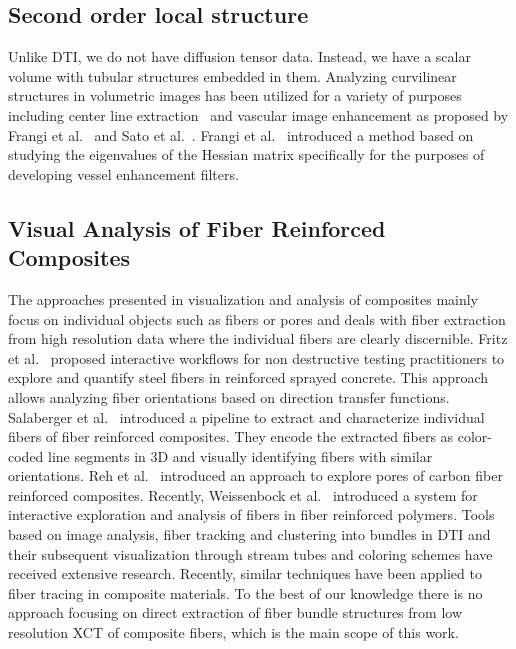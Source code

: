 \subsection{Second order local structure}
Unlike DTI, we do not have diffusion tensor data. Instead, we have a scalar volume with tubular structures embedded in them. Analyzing curvilinear structures in volumetric images has been utilized for a variety of purposes including center line extraction~\cite{Bouix2005} and vascular image enhancement as proposed by Frangi et al.~\cite{Frangi1998} and Sato et al.~\cite{Sato1997}. Frangi et al.~\cite{Frangi1998} introduced a method based on studying the eigenvalues of the  Hessian matrix specifically for the purposes of developing vessel enhancement filters.


\subsection {Visual Analysis of Fiber Reinforced Composites}
The approaches presented in visualization and analysis of composites mainly focus on individual objects such as fibers or pores and deals with fiber extraction from high resolution data where the individual fibers are clearly discernible. Fritz et al.~\cite{Fritz2009} proposed interactive workflows for non destructive testing practitioners to explore and quantify steel fibers in reinforced sprayed concrete. This approach allows analyzing fiber orientations based on direction transfer functions. Salaberger et al.~\cite{Salaberger2011} introduced a pipeline to extract and characterize individual fibers of fiber reinforced composites. They encode the extracted fibers as color-coded line segments in 3D and visually identifying fibers with similar orientations. Reh et al.~\cite{PMI_AR_2012} introduced an approach to explore pores of carbon fiber reinforced composites. Recently, Weissenbock et al.~\cite{Weissenbock2014} introduced a system for interactive exploration and analysis of fibers in fiber reinforced polymers. 
Tools based on image analysis, fiber tracking and clustering into bundles in DTI and their subsequent visualization through stream tubes and coloring schemes have received extensive research. Recently, similar techniques have been applied to fiber tracing in composite materials. To the best of our knowledge there is no approach focusing on direct extraction of fiber bundle structures from low resolution XCT of composite fibers, which is the main scope of this work.

